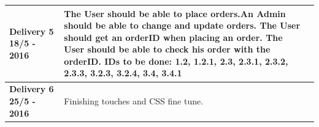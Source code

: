 \documentclass[a4paper,12pt]{article}
\begin{document}
\begin{table}[htbp]
\begin{tabular}{|L{4cm}|L{7cm}|L{4cm}|}
		\textbf{Delivery 5 18/5 - 2016} & The User should be able to place orders.\newline An Admin should be able to change and update orders. \newline The User should get an orderID when placing an order. \newline The User should be able to check his order with the orderID. \newline IDs to be done: 1.2, 1.2.1, 2.3, 2.3.1, 2.3.2, 2.3.3, 3.2.3, 3.2.4, 3.4, 3.4.1 &                 \\ \hline
		\textbf{Delivery 6 25/5 - 2016} & Finishing touches and CSS fine tune.                                                                                                                                                                                                                                                                                             &                 \\ \hline
	\end{tabular}
\end{table}
\end{document}
